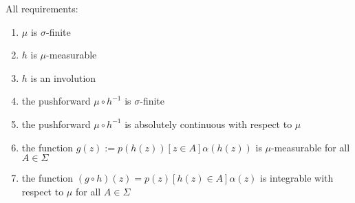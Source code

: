 \documentclass[twoside]{article}
\begin{document}
All requirements:
\begin{enumerate}
\item $\mu$ is $\sigma$-finite
\item $h$ is $\mu$-measurable
\item $h$ is an involution
\item the pushforward $\mu \circ h^{-1}$ is $\sigma$-finite
\item the pushforward $\mu \circ h^{-1}$ is absolutely continuous with respect to $\mu$
\item the function $g(z) := p(h(z)) [z \in A] \alpha(h(z))$ is $\mu$-measurable for all $A \in \Sigma$
\item the function $(g \circ h)(z) = p(z) [h(z) \in A] \alpha(z)$ is integrable with respect to $\mu$ for all $A \in \Sigma$
\end{enumerate}
\end{document}
